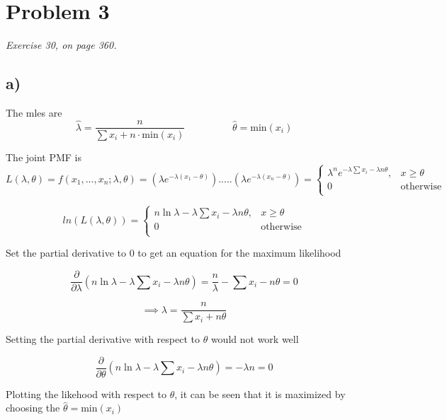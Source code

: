 \documentclass[a4paper,11pt]{article}
\begin{document}
\clearpage

\section*{Problem 3}

\textit{Exercise 30, on page 360.}

\subsection*{a)}
The mles are
\[
  \hat{\lambda} = \frac{n}{\sum{x_i} + n \cdot \text{min}(x_i)}
  \hspace{2cm}
  \hat{\theta} = \text{min}(x_i)
\]

The joint PMF is
\[
  L(\lambda, \theta) = f(x_1,...,x_n;\lambda,\theta) 
  = (\lambda e^{-\lambda (x_1 - \theta)}).....(\lambda e^{-\lambda (x_n - \theta)}) 
  = \begin{cases} 
    \lambda^n e^{-\lambda\sum{x_i} -\lambda n \theta} , & x \ge \theta \\
    0  & \text{otherwise} \\
  \end{cases}
\]

\[
 ln(L(\lambda, \theta)) 
 = \begin{cases}
  n\ln{\lambda} -\lambda\sum{x_i} -\lambda n \theta , & x \ge \theta \\
  0  & \text{otherwise} \\
 \end{cases}
\]

Set the partial derivative to 0 to get an equation for the maximum likelihood

\[
  \frac{\partial}{\partial \lambda} \left(n\ln{\lambda} -\lambda\sum{x_i} -\lambda n \theta\right)
  = \frac{n}{\lambda} - \sum{x_i} - n\theta = 0
\]

\begin{equation}
  \implies \lambda = \frac{n}{\sum{x_i} + n\theta}
\end{equation}

\vspace{1cm}
Setting the partial derivative with respect to $\theta$ would not work well

\[\frac{\partial}{\partial \theta} \left(n\ln{\lambda} -\lambda\sum{x_i} -\lambda n \theta\right) = -\lambda n = 0\]

\vspace{1cm}
Plotting the likehood with respect to $\theta$, it can be seen that it is maximized by choosing 
the $\hat{\theta} = \text{min}(x_i)$\newline
\end{document}
